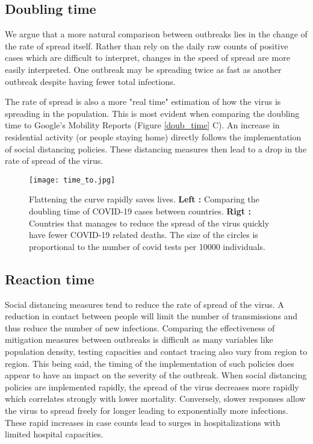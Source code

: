 \documentclass[alpha-refs]{wiley-article}
\begin{document}
\subsection{Doubling time}

We argue that a more natural comparison between outbreaks lies in the change of the rate of spread itself.
Rather than rely on the daily raw counts of positive cases which are difficult to interpret, changes in the speed of spread are more easily interpreted.
One outbreak may be spreading twice as fast as another outbreak despite having fewer total infections.


The rate of spread is also a more "real time" estimation of how the virus is spreading in the population.
This is most evident when comparing the doubling time to Google's Mobility Reports (Figure \ref{doub_time} C).
An increase in residential activity (or people staying home) directly follows the implementation of social distancing policies.
These distancing measures then lead to a drop in the rate of spread of the virus.

\begin{figure}[bt]
\centering
\texttt{[image: time\_to.jpg]}
\caption{
Flattening the curve rapidly saves lives.
\textbf{Left  :} Comparing the doubling time of COVID-19 cases between countries.
\textbf{Rigt  :} Countries that manages to reduce the spread of the virus quickly have fewer COVID-19 related deaths. The size of the circles is proportional to the number of covid tests per 10000 individuals.
}
\label{time}
\end{figure}

\subsection{Reaction time}
Social distancing measures tend to reduce the rate of spread of the virus.
A reduction in contact between people will limit the number of transmissions and thus reduce the number of new infections.
Comparing the effectiveness of mitigation measures between outbreaks is difficult as many variables like population density, testing capacities and contact tracing also vary from region to region.
This being said, the timing of the implementation of such policies does appear to have an impact on the severity of the outbreak.
When social distancing policies are implemented rapidly, the spread of the virus decreases more rapidly which correlates strongly with lower mortality.
Conversely, slower responses allow the virus to spread freely for longer leading to exponentially more infections.
These rapid increases in case counts lead to surges in hospitalizations with limited hospital capacities.
\end{document}
